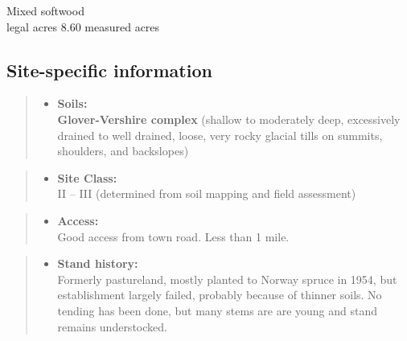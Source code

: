 \documentclass[]{tufte-handout}
\providecommand{\tightlist}{%
  \setlength{\itemsep}{0pt}\setlength{\parskip}{0pt}}
\begin{document}
Mixed softwood\\
 legal acres \textbar{} 8.60 measured acres

\subsection{Site-specific
information}\label{site-specific-information-1}

\begin{quote}
\begin{itemize}
\tightlist
\item
  \textbf{Soils:}\\
  \indent\indent  \textbf{Glover-Vershire complex} (shallow to
  moderately deep, excessively drained to well drained, loose, very
  rocky glacial tills on summits, shoulders, and backslopes)
\end{itemize}
\end{quote}

\begin{quote}
\begin{itemize}
\tightlist
\item
  \textbf{Site Class:}\\
  \vspace{2pt} II -- III (determined from soil mapping and field
  assessment)
\end{itemize}
\end{quote}

\begin{quote}
\begin{itemize}
\tightlist
\item
  \textbf{Access:}\\
  \vspace{2pt} Good access from town road. Less than 1 mile.
\end{itemize}
\end{quote}

\begin{quote}
\begin{itemize}
\tightlist
\item
  \textbf{Stand history:}\\
  \vspace{2pt} Formerly pastureland, mostly planted to Norway spruce in
  1954, but establishment largely failed, probably because of thinner
  soils. No tending has been done, but many stems are are young and
  stand remains understocked.
\end{itemize}
\end{quote}
\end{document}
